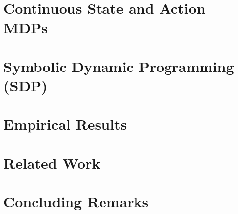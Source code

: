 \documentclass[letterpaper]{article}
\begin{document}


\section{Continuous State and Action MDPs}



\section{Symbolic Dynamic Programming (SDP)}



\section{Empirical Results}



\section{Related Work}



\section{Concluding Remarks}





\end{document}
